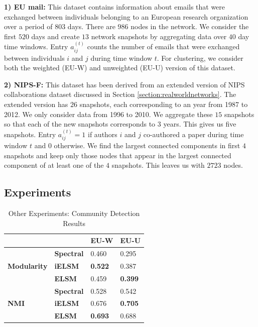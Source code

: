 \documentclass[letterpaper]{article} %
\begin{document}
\textbf{1) EU mail:}
This dataset \cite{ParanjapeEtAl:2017:MotifsInTemporalNetworks} contains information about emails that were exchanged between individuals belonging to an European research organization over a period of $803$ days. There are $986$ nodes in the network. We consider the first $520$ days and create $13$ network snapshots by aggregating data over $40$ day time windows. Entry $a_{ij}^{(t)}$ counts the number of emails that were exchanged between individuals $i$ and $j$ during time window $t$. For clustering, we consider both the weighted (EU-W) and unweighted (EU-U) version of this dataset.

\textbf{2) NIPS-F:}
This dataset has been derived from an extended version of NIPS collaborations dataset discussed in Section \ref{section:realworldnetworks}. The extended version \cite{RosenfeldEtAl:2014:LearningStructuredModelsWithTheAUCLossAndItsGeneralizations} has $26$ snapshots, each corresponding to an year from 1987 to 2012. We only consider data from 1996 to 2010. We aggregate these $15$ snapshots so that each of the new snapshots corresponds to $3$ years. This gives us five snapshots. Entry $a_{ij}^{(t)} = 1$ if authors $i$ and $j$ co-authored a paper during time window $t$ and $0$ otherwise. We find the largest connected components in first $4$ snapshots and keep only those nodes that appear in the largest connected component of at least one of the $4$ snapshots. This leaves us with $2723$ nodes.


\subsection{Experiments}
\label{appendix:experiments}

\begin{table}[t]
\caption{Other Experiments: Community Detection Results}
\label{table:clustering_results_appendix}
\vskip 0.1in
\begin{center}
\begin{small}
\begin{sc}
\begin{tabular}{p{1.9cm}lp{1.3cm}p{1.3cm}}
\toprule
& & \textbf{EU-W}& \textbf{EU-U} \\
\midrule
\multirow{3}{*}{\textbf{Modularity}}& \textbf{Spectral} & 0.460 & 0.295 \\
& \textbf{iELSM} & \textbf{0.522} & 0.387 \\
& \textbf{ELSM} & 0.459 & \textbf{0.399} \\
\hline
\multirow{3}{*}{\textbf{NMI}}& \textbf{Spectral} & 0.528 & 0.542 \\
& \textbf{iELSM} & 0.676 & \textbf{0.705} \\
& \textbf{ELSM} & \textbf{0.693} & 0.688 \\
\bottomrule
\end{tabular}
\end{sc}
\end{small}
\end{center}
\vskip -0.1in
\end{table}
\end{document}
